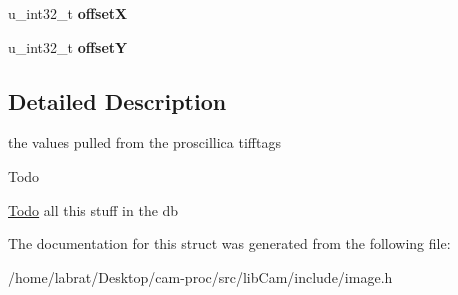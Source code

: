 \begin{DoxyCompactItemize}
\item 
u\+\_\+int32\+\_\+t {\bfseries offsetX}\hypertarget{structImage_1_1TiffTag__t_ae740ce497fef5af869e3dc26bc62941a}{}\label{structImage_1_1TiffTag__t_ae740ce497fef5af869e3dc26bc62941a}

\item 
u\+\_\+int32\+\_\+t {\bfseries offsetY}\hypertarget{structImage_1_1TiffTag__t_a0c6bdd38aab86d8110f51e7379d2f301}{}\label{structImage_1_1TiffTag__t_a0c6bdd38aab86d8110f51e7379d2f301}

\end{DoxyCompactItemize}


\subsection{Detailed Description}
the values pulled from the proscillica tifftags 

\begin{DoxyRefDesc}{Todo}
\item[\hyperlink{todo__todo000008}{Todo}]all this stuff in the db \end{DoxyRefDesc}


The documentation for this struct was generated from the following file\+:\begin{DoxyCompactItemize}
\item 
/home/labrat/\+Desktop/cam-\/proc/src/lib\+Cam/include/image.\+h\end{DoxyCompactItemize}
